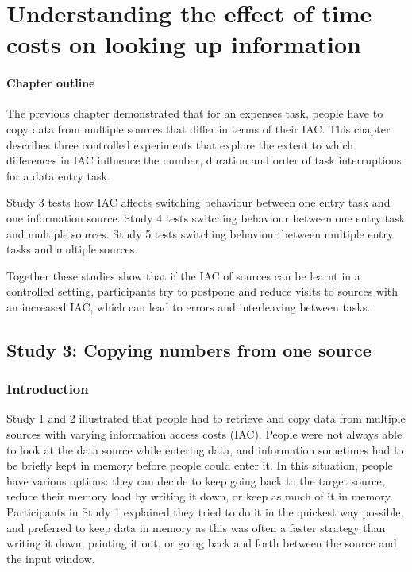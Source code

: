 \chapter{Understanding the effect of time costs on looking up information}

\begin{mynote}
\subsubsection{Chapter outline}
The previous chapter demonstrated that for an expenses task, people have to copy data from multiple sources that differ in terms of their IAC. This chapter describes three controlled experiments that explore the extent to which differences in IAC influence the number, duration and order of task interruptions for a data entry task. 

Study 3 tests how IAC affects switching behaviour between one entry task and one information source. Study 4 tests switching behaviour between one entry task and multiple sources. Study 5 tests switching behaviour between multiple entry tasks and multiple sources.

Together these studies show that if the IAC of sources can be learnt in a controlled setting, participants try to postpone and reduce visits to sources with an increased IAC, which can lead to errors and interleaving between tasks.

\end{mynote}

 
\section{Study 3: Copying numbers from one source}\label{ch:Study2}
\subsection{Introduction}
Study 1 and 2 illustrated that people had to retrieve and copy data from multiple sources with varying information access costs (IAC). People were not always able to look at the data source while entering data, and information sometimes had to be briefly kept in memory before people could enter it.
In this situation, people have various options: they can decide to keep going back to the target source, reduce their memory load by writing it down, or keep as much of it in memory. Participants in Study 1 explained they tried to do it in the quickest way possible, and preferred to keep data in memory as this was often a faster strategy than writing it down, printing it out, or going back and forth between the source and the input window.

